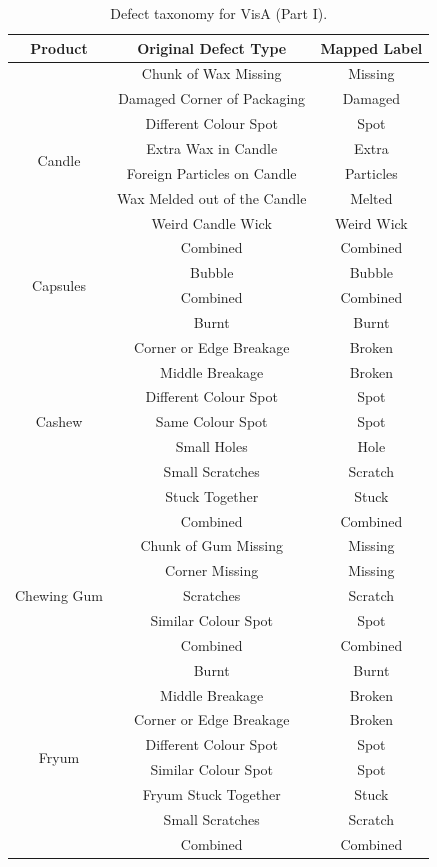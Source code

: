 \begin{table}
\centering
\footnotesize
\caption{Defect taxonomy for VisA (Part I).}
\label{tab:visa-mapping1}
\begin{tabular}{@{}ccc@{}}
\toprule
\textbf{Product} & \textbf{Original Defect Type} & \textbf{Mapped Label} \\
\midrule
\multirow{8}{*}{Candle} & Chunk of Wax Missing & Missing \\
 & Damaged Corner of Packaging & Damaged \\
 & Different Colour Spot & Spot \\
 & Extra Wax in Candle & Extra \\
 & Foreign Particles on Candle & Particles \\
 & Wax Melded out of the Candle & Melted \\
 & Weird Candle Wick & Weird Wick \\
 & Combined & Combined \\
\midrule
\multirow{2}{*}{Capsules} & Bubble & Bubble \\
 & Combined & Combined \\
\midrule
\multirow{9}{*}{Cashew} & Burnt & Burnt \\
 & Corner or Edge Breakage & Broken \\
 & Middle Breakage & Broken \\
 & Different Colour Spot & Spot \\
 & Same Colour Spot & Spot \\
 & Small Holes & Hole \\
 & Small Scratches & Scratch \\
 & Stuck Together & Stuck \\
 & Combined & Combined \\
\midrule
\multirow{5}{*}{Chewing Gum} & Chunk of Gum Missing & Missing \\
 & Corner Missing & Missing \\
 & Scratches & Scratch \\
 & Similar Colour Spot & Spot \\
 & Combined & Combined \\
\midrule
\multirow{8}{*}{Fryum} & Burnt & Burnt \\
 & Middle Breakage & Broken \\
 & Corner or Edge Breakage & Broken \\
 & Different Colour Spot & Spot \\
 & Similar Colour Spot & Spot \\
 & Fryum Stuck Together & Stuck \\
 & Small Scratches & Scratch \\
 & Combined & Combined \\
\bottomrule
\end{tabular}
\end{table}

